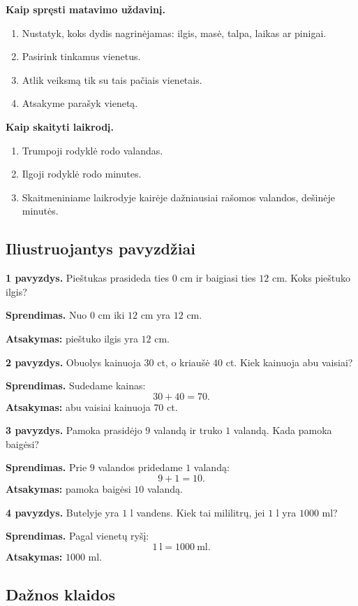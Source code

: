 \textbf{Kaip spręsti matavimo uždavinį.}
\begin{enumerate}
\item Nustatyk, koks dydis nagrinėjamas: ilgis, masė, talpa, laikas ar pinigai.
\item Pasirink tinkamus vienetus.
\item Atlik veiksmą tik su tais pačiais vienetais.
\item Atsakyme parašyk vienetą.
\end{enumerate}

\textbf{Kaip skaityti laikrodį.}
\begin{enumerate}
\item Trumpoji rodyklė rodo valandas.
\item Ilgoji rodyklė rodo minutes.
\item Skaitmeniniame laikrodyje kairėje dažniausiai rašomos valandos, dešinėje minutės.
\end{enumerate}

\subsection{Iliustruojantys pavyzdžiai}

\textbf{1 pavyzdys.} Pieštukas prasideda ties \(0\) cm ir baigiasi ties \(12\) cm. Koks pieštuko ilgis?

\textbf{Sprendimas.} Nuo \(0\) cm iki \(12\) cm yra \(12\) cm.

\textbf{Atsakymas:} pieštuko ilgis yra \(12\) cm.

\textbf{2 pavyzdys.} Obuolys kainuoja \(30\) ct, o kriaušė \(40\) ct. Kiek kainuoja abu vaisiai?

\textbf{Sprendimas.} Sudedame kainas:
\[
30+40=70.
\]
\textbf{Atsakymas:} abu vaisiai kainuoja \(70\) ct.

\textbf{3 pavyzdys.} Pamoka prasidėjo \(9\) valandą ir truko \(1\) valandą. Kada pamoka baigėsi?

\textbf{Sprendimas.} Prie \(9\) valandos pridedame \(1\) valandą:
\[
9+1=10.
\]
\textbf{Atsakymas:} pamoka baigėsi \(10\) valandą.

\textbf{4 pavyzdys.} Butelyje yra \(1\) l vandens. Kiek tai mililitrų, jei \(1\) l yra \(1000\) ml?

\textbf{Sprendimas.} Pagal vienetų ryšį:
\[
1\ \text{l}=1000\ \text{ml}.
\]
\textbf{Atsakymas:} \(1000\) ml.

\subsection{Dažnos klaidos}

